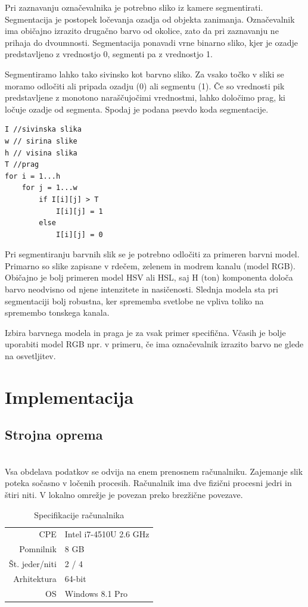 \documentclass[a4paper, 12pt]{book}
\begin{document}
Pri zaznavanju označevalnika je potrebno sliko iz kamere segmentirati. Segmentacija je postopek ločevanja ozadja od objekta zanimanja. Označevalnik ima običajno izrazito drugačno barvo od okolice, zato da pri zaznavanju ne prihaja do dvoumnosti. Segmentacija ponavadi vrne binarno sliko, kjer je ozadje predstavljeno z vrednostjo 0, segmenti pa z vrednostjo 1. 

Segmentiramo lahko tako sivinsko kot barvno sliko. Za vsako točko v sliki se moramo odločiti ali pripada ozadju (0) ali segmentu (1). Če so vrednosti pik predstavljene z monotono naraščujočimi vrednostmi, lahko določimo prag, ki ločuje ozadje od segmenta. Spodaj je podana psevdo koda segmentacije.
\begin{lstlisting}
I //sivinska slika
w // sirina slike
h // visina slika
T //prag
for i = 1...h
    for j = 1...w
        if I[i][j] > T
            I[i][j] = 1
        else
            I[i][j] = 0
\end{lstlisting}

Pri segmentiranju barvnih slik se je potrebno odločiti za primeren barvni model. Primarno so slike zapisane v rdečem, zelenem in modrem kanalu (model RGB). Običajno je bolj primeren model HSV ali HSL, saj H (ton) komponenta določa barvo neodvisno od njene intenzitete in nasičenosti. Slednja modela sta pri segmentaciji bolj robustna, ker sprememba svetlobe ne vpliva toliko na spremembo tonskega kanala.

Izbira barvnega modela in praga je za vsak primer specifična. Včasih je bolje uporabiti model RGB npr. v primeru, če ima označevalnik izrazito barvo ne glede na osvetljitev.

\chapter{Implementacija}

\section{Strojna oprema}

 \\
Vsa obdelava podatkov se odvija na enem prenosnem računalniku. Zajemanje slik poteka sočasno v ločenih procesih. Računalnik ima dve fizični procesni jedri in štiri niti. V lokalno omrežje je povezan preko brezžične povezave. 

\begin{table}[H]
\centering
\begin{tabular}{| r | l |}
\hline
CPE & Intel i7-4510U 2.6 GHz \\
Pomnilnik & 8 GB \\
Št. jeder/niti & 2 / 4 \\
Arhitektura & 64-bit \\
OS & Windows 8.1 Pro \\
\hline
\end{tabular}
\caption{Specifikacije računalnika}
\end{table}
\end{document}

